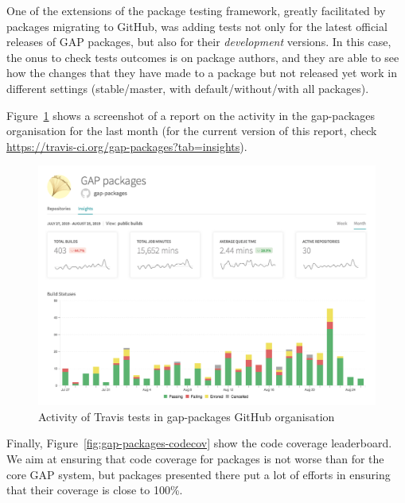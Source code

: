 \documentclass{deliverablereport}
\begin{document}
One of the extensions of the package testing framework, greatly 
facilitated by packages migrating to GitHub, was adding tests not
only for the latest official releases of GAP packages, but also
for their \emph{development} versions.
In this case, the onus to check tests outcomes is on package authors,
and they are able to see how the changes that they have made to
a package but not released yet work in different settings (stable/master,
with default/without/with all packages).

Figure~\ref{fig:gap-packages-travis} shows a screenshot of a 
report on the activity in the gap-packages organisation 
for the last month (for the current version of 
this report, check \url{https://travis-ci.org/gap-packages?tab=insights}).

\begin{figure}[!ht]
    \centering
    \includegraphics[width=\textwidth]{images/gap-packages-travis}
    \caption{Activity of Travis tests in gap-packages GitHub organisation}
    \label{fig:gap-packages-travis}
\end{figure}

Finally, Figure~\ref{fig:gap-packages-codecov} show the code coverage
leaderboard. We aim at ensuring that code coverage for packages is 
not worse than for the core GAP system, but packages presented there 
put a lot of efforts in ensuring that their coverage is close to 100\%. 
\end{document}
